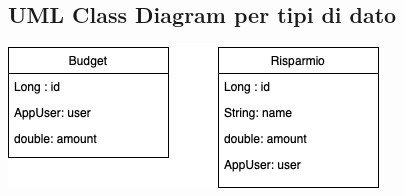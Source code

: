 \subsection{UML Class Diagram per tipi di dato}
\hspace{35pt}
\begin{center}
    \includegraphics[scale=0.85]{images/DiagrammaClassiTipoDatoBudgetRisparmio.png}
\end{center}



